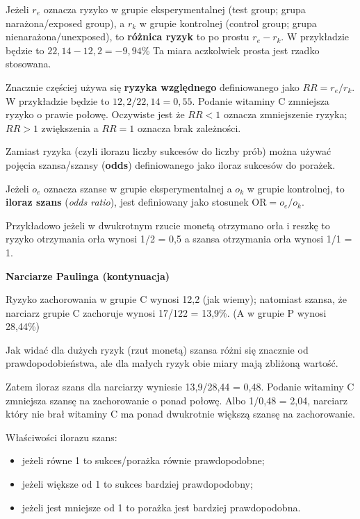 \documentclass[
  openany]{book}
\providecommand{\tightlist}{%
  \setlength{\itemsep}{0pt}\setlength{\parskip}{0pt}}
\begin{document}
Jeżeli \(r_e\) oznacza ryzyko w grupie eksperymentalnej
(test group; grupa narażona/exposed group),
a \(r_k\) w grupie kontrolnej (control group; grupa nienarażona/unexposed),
to \textbf{różnica ryzyk} to po prostu \(r_e - r_k\).
W przykładzie będzie to \(22,14 - 12,2 = -9,94\)\%
Ta miara aczkolwiek prosta jest rzadko stosowana.

Znacznie częściej używa się \textbf{ryzyka względnego} definiowanego jako
\(RR = r_e/r_k\). W przykładzie będzie to \(12,2/22,14 = 0,55\).
Podanie witaminy C zmniejsza ryzyko o prawie połowę.
Oczywiste jest że \(RR < 1\) oznacza zmniejszenie
ryzyka; \(RR > 1\) zwiększenia a \(RR = 1\) oznacza brak zależności.

Zamiast ryzyka (czyli ilorazu liczby sukcesów do liczby prób) można używać
pojęcia szansa/szansy (\textbf{odds}) definiowanego
jako iloraz sukcesów do porażek.

Jeżeli \(o_e\) oznacza szanse w grupie eksperymentalnej
a \(o_k\) w grupie kontrolnej, to \textbf{iloraz szans} (\emph{odds ratio}), jest
definiowany jako stosunek \(\textrm{OR} = o_e/o_k\).

Przykładowo jeżeli w dwukrotnym rzucie monetą otrzymano orła i reszkę to ryzyko
otrzymania orła wynosi 1/2 = 0,5 a szansa otrzymania orła wynosi 1/1 = 1.

\begin{example}
\textbf{Narciarze Paulinga (kontynuacja)}

Ryzyko zachorowania w grupie C wynosi 12,2 (jak wiemy); natomiast szansa, że narciarz grupie C
zachoruje wynosi 17/122 = 13,9\%. (A w grupie P wynosi 28,44\%)

Jak widać dla dużych ryzyk (rzut monetą) szansa
różni się znacznie od prawdopodobieństwa, ale dla małych ryzyk obie miary mają zbliżoną wartość.

Zatem iloraz szans
dla narciarzy wyniesie 13,9/28,44 = 0,48.
Podanie witaminy C zmniejsza szansę na zachorowanie o ponad połowę.
Albo 1/0,48 = 2,04, narciarz który nie brał witaminy C ma ponad
dwukrotnie większą szansę na zachorowanie.
\end{example}

Właściwości ilorazu szans:

\begin{itemize}
\tightlist
\item
  jeżeli równe 1 to sukces/porażka równie prawdopodobne;
\item
  jeżeli większe od 1 to sukces bardziej prawdopodobny;
\item
  jeżeli jest mniejsze od 1 to porażka jest bardziej prawdopodobna.
\end{itemize}
\end{document}
